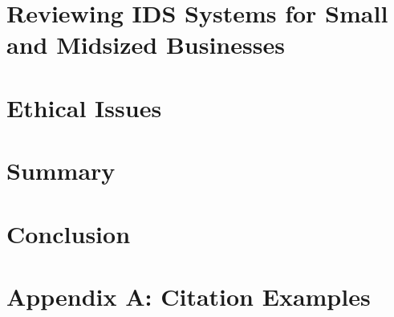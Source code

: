 \documentclass[conference]{IEEEtran}
\begin{document}
\section{Reviewing IDS Systems for Small and Midsized Businesses}


\section{Ethical Issues}


\section{Summary}


\section{Conclusion}


\section*{Appendix A:  Citation Examples}





\newcommand{\noroffcount}[1]{%
\immediate\write18{texcount -v0 -q -total  -sum -merge -q #1.tex > #1-words.noroff }%
}
%
%

\newcommand{\NUCwordcount}[1]{
    \section*{Word count metrics}
    \framebox{%
    \begin{minipage}{0.95\textwidth}
    \textbf{NUC Studio2 Word Count}:\\
    \noroffcount{#1}
    NOTE: References are excluded.
    \end{minipage}}
}

\newpage
\end{document}
